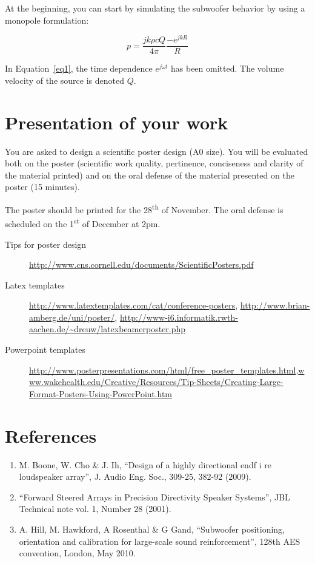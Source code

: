 \documentclass[a4paper, 12pt]{article}
\begin{document}
At the beginning, you can start by simulating the subwoofer behavior by using a monopole formulation:

\begin{equation}
	p = \frac{jk\rho cQ}{4\pi}\frac{-e^{jkR}}{R} \label{eq1}
\end{equation}

In Equation~\ref{eq1}, the time dependence $e^{j\omega t}$ has been omitted. The volume velocity of the source is
denoted $Q$.

\section{Presentation of your work}

You are asked to design a scientific poster design (A0 size). You will be
evaluated both on the poster (scientific work quality, pertinence, conciseness
and clarity of the material printed) and on the oral defense of the material
presented on the poster (15 minutes).

The poster should be printed for the 28\textsuperscript{th} of November. The oral defense is
scheduled on the 1\textsuperscript{st} of December at 2pm.

{\scriptsize
\begin{description}
	\item[Tips for poster design] \url{http://www.cns.cornell.edu/documents/ScientificPosters.pdf}
	\item[Latex templates] \url{http://www.latextemplates.com/cat/conference-posters},
		\url{http://www.brian-amberg.de/uni/poster/},
		\url{http://www-i6.informatik.rwth-aachen.de/~dreuw/latexbeamerposter.php}
	\item[Powerpoint templates]
		\url{http://www.posterpresentations.com/html/free_poster_templates.html},\url{www.wakehealth.edu/Creative/Resources/Tip-Sheets/Creating-Large-Format-Posters-Using-PowerPoint.htm}
\end{description}
}


\section*{References}

\begin{enumerate}
	\item M. Boone, W. Cho \& J. Ih, “Design of a highly directional endf i re loudspeaker array”, J. Audio Eng. Soc., 309-25, 382-92 (2009).
	\item “Forward Steered Arrays in Precision Directivity Speaker Systems”, JBL Technical note vol. 1, Number 28 (2001).
	\item A. Hill, M. Hawkford, A Rosenthal \& G Gand, “Subwoofer positioning, orientation and calibration for large-scale sound reinforcement”, 128th AES convention, London, May 2010.
\end{enumerate}
\end{document}
